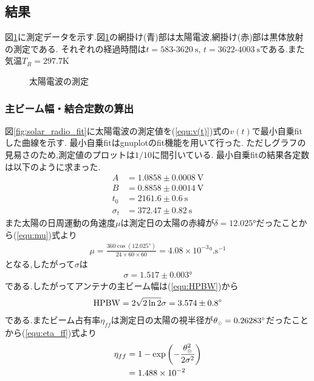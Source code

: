 \subsection{結果}
図\ref{fig:solar_radio_raw}に測定データを示す.図\ref{fig:solar_radio_raw}の網掛け(青)部は太陽電波,網掛け(赤)部は黒体放射の測定である.
それぞれの経過時間は$t=583$-$3620\ \si{\second}$, $t=3622$-$4003\ \si{\second}$である.また気温$T_R=297.7\si{\kelvin}$
\begin{figure}[hptb]
\begin{center}

\caption{太陽電波の測定}
\label{fig:solar_radio_raw}
\end{center}
\end{figure}
\clearpage
\subsubsection{主ビーム幅・結合定数の算出}
図\ref{fig:solar_radio_fit}に太陽電波の測定値を(\ref{equ:v(t)})式の$v(t)$で最小自乗fitした曲線を示す.
最小自乗fitはgnuplotのfit機能を用いて行った.
ただしグラフの見易さのため,測定値のプロットは$1/10$に間引いている.
最小自乗fitの結果各定数は以下のように求まった.
\begin{align}
  A&=1.0858\pm0.0008\ \si{\volt}\\
  B&=0.8858\pm0.0014\ \si{\volt}\\
  t_0&=2161.6\pm0.6\ \si{\second}\\
  \sigma_t&=372.47\pm0.82\ \si{\second}
\end{align}
また太陽の日周運動の角速度$\mu$は測定日の太陽の赤緯が$\delta=12.025\si{\degree}$だったことから(\ref{equ:mu})式より
\begin{align}
  \mu=\frac{360\cos(12.025\si{\degree})}{24\times60\times60}=4.08\times10^{-3}\si{\degree.\second^{-1}}
\end{align}
となる,したがって$\sigma$は
\begin{align}
  \sigma=1.517\pm0.003\si{\degree}
\end{align}
である.したがってアンテナの主ビーム幅は(\ref{equ:HPBW})から
\begin{align}
  {\rm HPBW}=2\sqrt{2\ln2}\sigma=3.574\pm0.8\si{\degree}
\end{align}
である.またビーム占有率$\eta_{ff}$は測定日の太陽の視半径が$\theta_{\tiny\astrosun}=0.26283\si{\degree}$だったことから(\ref{equ:eta_ff})式より
\begin{align}
  \eta_{ff}&=1-\exp\left(-\frac{\theta_{\tiny\astrosun}^2}{2\sigma^2}\right)\nonumber\\
  &=1.488\times10^{-2}
\end{align}
